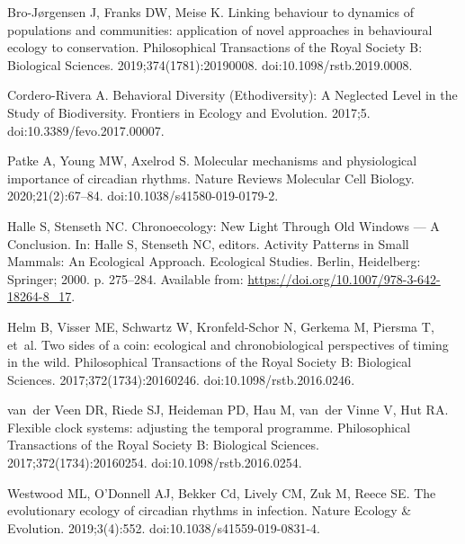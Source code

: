 \documentclass[12pt]{article}
\begin{document}
\begin{thebibliography}{10}
	
	Bro-Jørgensen J, Franks DW, Meise K.
	\newblock Linking behaviour to dynamics of populations and communities:
	application of novel approaches in behavioural ecology to conservation.
	\newblock Philosophical Transactions of the Royal Society B: Biological
	Sciences. 2019;374(1781):20190008.
	\newblock doi:{10.1098/rstb.2019.0008}.
	
	Cordero-Rivera A.
	\newblock Behavioral {Diversity} ({Ethodiversity}): {A} {Neglected} {Level} in
	the {Study} of {Biodiversity}.
	\newblock Frontiers in Ecology and Evolution. 2017;5.
	\newblock doi:{10.3389/fevo.2017.00007}.
	
	Patke A, Young MW, Axelrod S.
	\newblock Molecular mechanisms and physiological importance of circadian
	rhythms.
	\newblock Nature Reviews Molecular Cell Biology. 2020;21(2):67--84.
	\newblock doi:{10.1038/s41580-019-0179-2}.
	
	Halle S, Stenseth NC.
	\newblock Chronoecology: {New} {Light} {Through} {Old} {Windows} — {A}
	{Conclusion}.
	\newblock In: Halle S, Stenseth NC, editors. Activity {Patterns} in {Small}
	{Mammals}: {An} {Ecological} {Approach}. Ecological {Studies}. Berlin,
	Heidelberg: Springer; 2000. p. 275--284.
	\newblock Available from: \url{https://doi.org/10.1007/978-3-642-18264-8_17}.
	
	Helm B, Visser ME, Schwartz W, Kronfeld-Schor N, Gerkema M, Piersma T, et~al.
	\newblock Two sides of a coin: ecological and chronobiological perspectives of
	timing in the wild.
	\newblock Philosophical Transactions of the Royal Society B: Biological
	Sciences. 2017;372(1734):20160246.
	\newblock doi:{10.1098/rstb.2016.0246}.
	
	van~der Veen DR, Riede SJ, Heideman PD, Hau M, van~der Vinne V, Hut RA.
	\newblock Flexible clock systems: adjusting the temporal programme.
	\newblock Philosophical Transactions of the Royal Society B: Biological
	Sciences. 2017;372(1734):20160254.
	\newblock doi:{10.1098/rstb.2016.0254}.
	
	Westwood ML, O’Donnell AJ, Bekker Cd, Lively CM, Zuk M, Reece SE.
	\newblock The evolutionary ecology of circadian rhythms in infection.
	\newblock Nature Ecology \& Evolution. 2019;3(4):552.
	\newblock doi:{10.1038/s41559-019-0831-4}.
	

\end{thebibliography}
\end{document}
